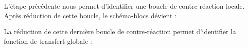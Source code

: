 L'étape précédente nous permet d'identifier une boucle de contre-réaction 
locale. Après réduction de cette boucle, le schéma-blocs dévient :
\begin{center}
\end{center}
La réduction de cette dernière boucle de contre-réaction permet d'identifier 
la fonction de transfert globale :
\begin{center}
\end{center}
